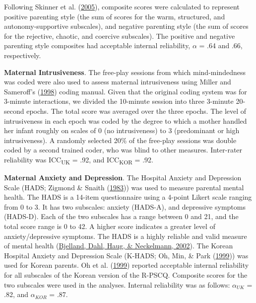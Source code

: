\documentclass[
]{article}
\begin{document}
Following Skinner et al. (\protect\hyperlink{ref-Skinner2005}{2005}), composite scores were calculated to represent positive parenting style (the sum of scores for the warm, structured, and autonomy-supportive subscales), and negative parenting style (the sum of scores for the rejective, chaotic, and coercive subscales). The positive and negative parenting style composites had acceptable internal reliability, \(\alpha\) = .64 and .66, respectively.

\textbf{Maternal Intrusiveness}. The free-play sessions from which mind-mindedness was coded were also used to assess maternal intrusiveness using Miller and Sameroff's (\protect\hyperlink{ref-Miller1998}{1998}) coding manual. Given that the original coding system was for 3-minute interactions, we divided the 10-minute session into three 3-minute 20-second epochs. The total score was averaged over the three epochs. The level of intrusiveness in each epoch was coded by the degree to which a mother handled her infant roughly on scales of 0 (no intrusiveness) to 3 (predominant or high intrusiveness). A randomly selected 20\% of the free-play sessions was double coded by a second trained coder, who was blind to other measures. Inter-rater reliability was ICC\textsubscript{UK} = .92, and ICC\textsubscript{KOR} = .92.

\textbf{Maternal Anxiety and Depression}. The Hospital Anxiety and Depression Scale (HADS; Zigmond \& Snaith (\protect\hyperlink{ref-Zigmond1983}{1983})) was used to measure parental mental health. The HADS is a 14-item questionnaire using a 4-point Likert scale ranging from 0 to 3. It has two subscales: anxiety (HADS-A), and depressive symptoms (HADS-D). Each of the two subscales has a range between 0 and 21, and the total score range is 0 to 42. A higher score indicates a greater level of anxiety/depressive symptoms. The HADS is a highly reliable and valid measure of mental health (\protect\hyperlink{ref-Bjelland2002}{Bjelland, Dahl, Haug, \& Neckelmann, 2002}). The Korean Hospital Anxiety and Depression Scale (K-HADS; Oh, Min, \& Park (\protect\hyperlink{ref-Oh1999}{1999})) was used for Korean parents. Oh et al. (\protect\hyperlink{ref-Oh1999}{1999}) reported acceptable internal reliability for all subscales of the Korean version of the R-PSCQ. Composite scores for the two subscales were used in the analyses. Internal reliability was as follows: \(\alpha_{UK}\) = .82, and \(\alpha_{KOR}\) = .87.
\end{document}
